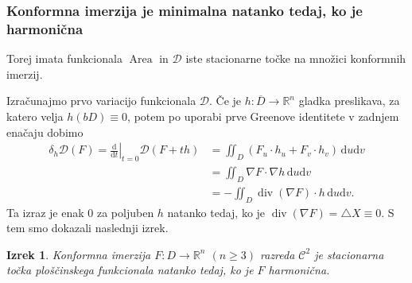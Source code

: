 \documentclass[8pt]{beamer}
\theoremstyle{definition}
\theoremstyle{remark}
\theoremstyle{plain}
\newtheorem{izrek}[definicija]{Izrek}
\numberwithin{equation}{section}  %
\begin{document}
\begin{frame}
    \frametitle{Konformna imerzija je minimalna natanko tedaj, ko je harmonična}

    Torej imata funkcionala $\operatorname{Area}$ in $\mathscr{D}$ iste stacionarne točke na množici konformnih imerzij.

    \vspace{0.8em}

    Izračunajmo prvo variacijo funkcionala $\mathscr{D}$. Če je $h: \overline{D} \rightarrow \mathbb{R}^n$ gladka preslikava, za katero velja $h(bD)\equiv 0$, potem po uporabi prve Greenove identitete v zadnjem enačaju dobimo
    \begin{align*}
        \delta_h \mathscr{D}(F)=\left.\frac{\mathrm{d}}{\mathrm{d} t}\right|_{t=0} \mathscr{D}(F+t h) &=\iint_D\left(F_u \cdot h_u+F_v \cdot h_v\right) \, \mathrm{d} u \mathrm{d} v \\
        &=\iint_D \nabla F \cdot \nabla h \, \mathrm{d} u \mathrm{d} v \\
        &=-\iint_D \operatorname{div}(\nabla F) \cdot h \, \mathrm{d} u \mathrm{d} v.
    \end{align*}
    Ta izraz je enak $0$ za poljuben $h$ natanko tedaj, ko je $\operatorname{div}(\nabla F)= \bigtriangleup X \equiv 0$. S tem smo dokazali naslednji izrek.
    \begin{izrek}
        Konformna imerzija $F: D \rightarrow \mathbb{R}^n$ $(n \geq 3)$ razreda $\mathscr{C}^2$ je stacionarna točka ploščinskega funkcionala natanko tedaj, ko je $F$ harmonična.
    \end{izrek}

\end{frame}
\end{document}
